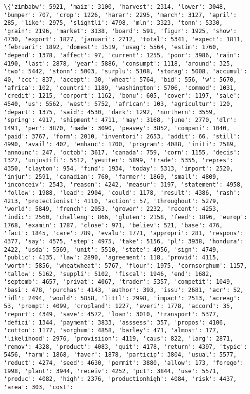 \documentclass[11pt]{article}
\begin{document}
    \begin{Verbatim}[commandchars=\\\{\}]
\{'zimbabw': 5921, 'maiz': 3100, 'harvest': 2314, 'lower': 3048, 'bumper': 707, 'crop': 1226, 'harar': 2295, 'march': 3127, 'april': 285, 'like': 2975, 'slightli': 4798, 'mln': 3323, 'tonn': 5330, 'grain': 2196, 'market': 3138, 'board': 591, 'figur': 1925, 'show': 4730, 'export': 1827, 'januari': 2712, 'total': 5341, 'expect': 1811, 'februari': 1892, 'domest': 1519, 'usag': 5564, 'estim': 1760, 'depend': 1378, 'affect': 97, 'current': 1255, 'poor': 3986, 'rain': 4190, 'last': 2878, 'year': 5886, 'consumpt': 1118, 'around': 325, 'two': 5442, 'stonn': 5003, 'surplu': 5108, 'storag': 5008, 'accumul': 40, 'ccc': 837, 'accept': 30, 'wheat': 5764, 'bid': 556, 'w': 5670, 'africa': 102, 'countri': 1189, 'washington': 5706, 'commod': 1031, 'credit': 1215, 'corport': 1162, 'bonu': 605, 'cover': 1197, 'sale': 4540, 'us': 5562, 'west': 5752, 'african': 103, 'agricultur': 120, 'depart': 1375, 'said': 4530, 'dark': 1292, 'northern': 3559, 'spring': 4917, 'shipment': 4711, 'may': 3168, 'june': 2770, 'dlr': 1491, 'per': 3870, 'made': 3090, 'peavey': 3852, 'compani': 1040, 'paid': 3767, 'form': 2010, 'inventori': 2653, 'addit': 66, 'still': 4990, 'avail': 402, 'enhanc': 1700, 'program': 4088, 'initi': 2589, 'announc': 247, 'octob': 3617, 'canada': 759, 'corn': 1155, 'decis': 1327, 'unjustifi': 5512, 'yeutter': 5899, 'trade': 5355, 'repres': 4350, 'clayton': 954, 'find': 1934, 'today': 5313, 'import': 2520, 'injur': 2591, 'canadian': 760, 'farmer': 1869, 'small': 4809, 'inconceiv': 2543, 'reason': 4242, 'measur': 3197, 'statement': 4958, 'follow': 1988, 'lead': 2904, 'could': 1178, 'result': 4386, 'rash': 4213, 'protectionist': 4110, 'action': 57, 'throughout': 5279, 'world': 5849, 'french': 2053, 'grower': 2232, 'recent': 4253, 'indic': 2560, 'challeng': 866, 'gluten': 2158, 'feed': 1896, 'europ': 1768, 'examin': 1787, 'close': 971, 'believ': 521, 'base': 476, 'fact': 1845, 'care': 789, 'evalu': 1771, 'appropri': 281, 'respons': 4377, 'say': 4575, 'step': 4975, 'take': 5156, 'pl': 3938, 'hondura': 2422, 'usda': 5569, 'unit': 5510, 'state': 4956, 'sign': 4749, 'public': 4135, 'law': 2890, 'agreement': 118, 'provid': 4115, 'worth': 5856, 'wheatwheat': 5767, 'flour': 1975, 'cornsorghum': 1157, 'tallow': 5162, 'suppli': 5102, 'fiscal': 1946, 'end': 1682, 'septemb': 4657, 'privat': 4067, 'trader': 5357, 'competit': 1049, 'basi': 478, 'purchas': 4143, 'author': 393, 'issu': 2681, 'acr': 52, 'idl': 2494, 'would': 5858, 'littl': 2998, 'impact': 2513, 'acreag': 53, 'prompt': 4099, 'cropland': 1227, 'everi': 1778, 'accord': 35, 'report': 4349, 'save': 4572, 'loan': 3010, 'transport': 5377, 'defici': 1344, 'payment': 3833, 'asssess': 357, 'propos': 4106, 'cotton': 1177, 'sorghum': 4858, 'barley': 471, 'almost': 177, 'likelihood': 2976, 'provisiion': 4119, 'caus': 822, 'larg': 2871, 'remov': 4328, 'product': 4083, 'quit': 4178, 'return': 4397, 'typic': 5456, 'farm': 1868, 'favor': 1878, 'particip': 3804, 'usual': 5577, 'reduct': 4274, 'seed': 4630, 'permit': 3880, 'allow': 173, 'forego': 1998, 'plant': 3944, 'receiv': 4252, 'pct': 3844, 'use': 5571, 'produc': 4082, 'high': 2376, 'productionhigh': 4084, 'risk': 4437, 'area': 303, 'cost': 
\end{Verbatim}
\end{document}
